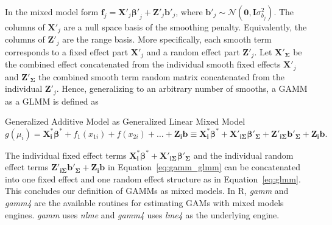 In the mixed model form $\bm{f}_j=\mathbf{X'}_j\bm{\beta'}_j + \mathbf{Z'}_j\bm{b'}_j$, where $\bm{b'}_j \sim \mathcal{N}(\bm{0}, \bm{I}\sigma^2_{b_{j}})$. The columns of $\mathbf{X'}_j$ are a null space basis of the smoothing penalty. Equivalently, the columns of $\mathbf{Z'}_j$ are the range basis. More specifically, each smooth term corresponds to a fixed effect part $\mathbf{X'}_j$ and a random effect part $\mathbf{Z'}_{j}$. Let $\mathbf{X'_\Sigma}$ be the combined effect concatenated from the individual smooth fixed effects $\bm{X'}_j$ and $\mathbf{Z'_\Sigma}$ the combined smooth term random matrix concatenated from the individual $\mathbf{Z}'_{j}$. Hence, generalizing to an arbitrary number of smooths, a GAMM as a GLMM is defined as

\begin{defi}Generalized Additive Model as Generalized Linear Mixed Model
\begin{equation}\label{eq:gamm_glmm}
    g(\mu_i) = \mathbf{X_i^*}\bm{\beta^*} + f_1(x_{1i}) + f(x_{2i}) + \dots + \mathbf{Z_i}\bm{b} \equiv \mathbf{X_i^*}\bm{\beta^*} + \mathbf{X'_{i \Sigma}}\bm{\beta'_{\Sigma}} +\mathbf{Z'_{i \Sigma}}\bm{b'_{\Sigma}} + \mathbf{Z_i}\bm{b}.
\end{equation}
\end{defi}

The individual fixed effect terms $\mathbf{X_i^*}\bm{\beta^*} + \mathbf{X'_{i \Sigma}}\bm{\beta'_{\Sigma}}$ and the individual random effect terms $\mathbf{Z'_{i \Sigma}}\bm{b'_{\Sigma}} + \mathbf{Z_i}\bm{b}$ in Equation~\ref{eq:gamm_glmm} can be concatenated into one fixed effect and one random effect structure as in Equation~\ref{eq:glmm}. This concludes our definition of GAMMs as mixed models. In R, \textit{gamm}\citep{wood_mgcv_2023} and \textit{gamm4} \citep{wood_gamm4_2020} are the available routines for estimating GAMs with mixed models engines. \textit{gamm} uses \textit{nlme} \citep{pinheiro2017package} and \textit{gamm4} uses \textit{lme4} \citep{bates_fitting_2015} as the underlying engine.

